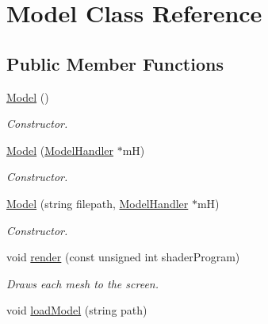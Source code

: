 \hypertarget{class_model}{\section{Model Class Reference}
\label{class_model}
}
\subsection*{Public Member Functions}
\begin{DoxyCompactItemize}
\item 
\hypertarget{class_model_ae3b375de5f6df4faf74a95d64748e048}{\hyperlink{class_model_ae3b375de5f6df4faf74a95d64748e048}{Model} ()}\label{class_model_ae3b375de5f6df4faf74a95d64748e048}

\begin{DoxyCompactList}\small\item\em Constructor. \end{DoxyCompactList}\item 
\hypertarget{class_model_aa89b499802cc5ed96d93c21b0c77fe88}{\hyperlink{class_model_aa89b499802cc5ed96d93c21b0c77fe88}{Model} (\hyperlink{class_model_handler}{Model\+Handler} $\ast$m\+H)}\label{class_model_aa89b499802cc5ed96d93c21b0c77fe88}

\begin{DoxyCompactList}\small\item\em Constructor. \end{DoxyCompactList}\item 
\hypertarget{class_model_a73e179d8121f55124f021559df776e76}{\hyperlink{class_model_a73e179d8121f55124f021559df776e76}{Model} (string filepath, \hyperlink{class_model_handler}{Model\+Handler} $\ast$m\+H)}\label{class_model_a73e179d8121f55124f021559df776e76}

\begin{DoxyCompactList}\small\item\em Constructor. \end{DoxyCompactList}\item 
\hypertarget{class_model_a0885da76930d0f3b919eaa10ae08e8ab}{void \hyperlink{class_model_a0885da76930d0f3b919eaa10ae08e8ab}{render} (const unsigned int shader\+Program)}\label{class_model_a0885da76930d0f3b919eaa10ae08e8ab}

\begin{DoxyCompactList}\small\item\em Draws each mesh to the screen. \end{DoxyCompactList}\item 
\hypertarget{class_model_a293cf3e4b03935164fbee0fab62c78cd}{void \hyperlink{class_model_a293cf3e4b03935164fbee0fab62c78cd}{load\+Model} (string path)}\label{class_model_a293cf3e4b03935164fbee0fab62c78cd}


\end{DoxyCompactItemize}
